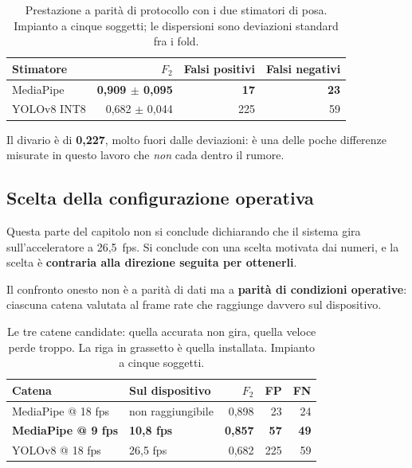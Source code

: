 \begin{table}[ht]
\centering
\caption{Prestazione a parità di protocollo con i due stimatori di posa.
Impianto a cinque soggetti; le dispersioni sono deviazioni standard fra i fold.}
\label{tab:stimatori_f2}
\begin{tabular}{lrrr}
\toprule
Stimatore & $F_2$ & Falsi positivi & Falsi negativi \\
\midrule
MediaPipe & \textbf{0,909 $\pm$ 0,095} & \textbf{17} & \textbf{23} \\
YOLOv8 INT8 & 0,682 $\pm$ 0,044 & 225 & 59 \\
\bottomrule
\end{tabular}
\end{table}

Il divario è di \textbf{0,227}, molto fuori dalle deviazioni: è una delle poche differenze misurate in questo lavoro che \emph{non} cada dentro il rumore.

\subsection{Scelta della configurazione operativa}
\label{sec:decisione}

Questa parte del capitolo non si conclude dichiarando che il sistema gira sull'acceleratore a 26,5~fps. Si conclude con una scelta motivata dai numeri, e la scelta è \textbf{contraria alla direzione seguita per ottenerli}.

Il confronto onesto non è a parità di dati ma a \textbf{parità di condizioni operative}: ciascuna catena valutata al frame rate che raggiunge davvero sul dispositivo.

\begin{table}[ht]
\centering
\caption{Le tre catene candidate: quella accurata non gira, quella veloce
perde troppo. La riga in grassetto è quella installata. Impianto a cinque
soggetti.}
\label{tab:catene}
\begin{tabular}{llrrr}
\toprule
Catena & Sul dispositivo & $F_2$ & FP & FN \\
\midrule
MediaPipe @ 18 fps & non raggiungibile & 0,898 & 23 & 24 \\
\textbf{MediaPipe @ 9 fps} & \textbf{10,8 fps} & \textbf{0,857} & \textbf{57} & \textbf{49} \\
YOLOv8 @ 18 fps & 26,5 fps & 0,682 & 225 & 59 \\
\bottomrule
\end{tabular}
\end{table}

